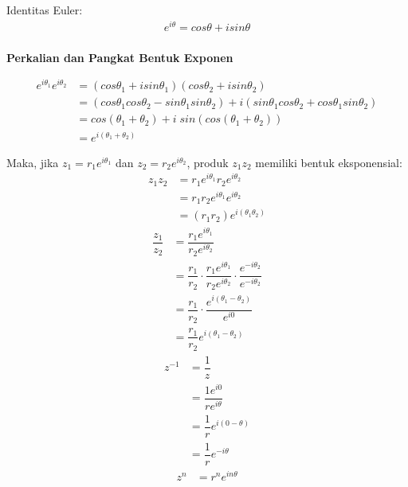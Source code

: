 \documentclass{article}
\begin{document}
    Identitas Euler:
    \begin{align}
        e^{i\theta} = cos\theta + i sin\theta \\\nonumber
    \end{align}

    \newpage
    \begin{center}
        \textbf{Perkalian dan Pangkat Bentuk Exponen}
    \end{center}
    \begin{align}
        e^{i\theta_1} e^{i\theta_2} &= (cos\theta_1 + i sin\theta_1)(cos\theta_2 + i sin\theta_2)
                                    \nonumber\\
                                    &=(cos\theta_1 cos\theta_2 - sin\theta_1 sin\theta_2) + i(sin\theta_1cos\theta_2 + cos\theta_1 sin\theta_2)
                                    \nonumber\\
                                    &= cos(\theta_1 + \theta_2) + i\;sin(cos(\theta_1 + \theta_2))
                                    \nonumber\\
                                    &= e^{i(\theta_1 + \theta_2)}
    \end{align}
    
    Maka, jika $z_1 = r_1e^{i\theta_1}$ dan $z_2 = r_2e^{i\theta_2}$, produk $z_1z_2$ memiliki bentuk eksponensial:
    \begin{align}
        z_1z_2  &= r_1e^{i\theta_1} r_2e^{i\theta_2}
                \nonumber\\
                &= r_1r_2e^{i\theta_1}e^{i\theta_2}
                \nonumber\\
                &= (r_1r_2)e^{i(\theta_1\theta_2)}
    \end{align}
    \begin{align}
        \dfrac{z_1}{z_2}    &= \dfrac{r_1e^{i\theta_1}}{r_2e^{i\theta_2}}
                            \nonumber\\
                            &= \dfrac{r_1}{r_2} \cdot \dfrac{r_1e^{i\theta_1}}{r_2e^{i\theta_2}} \cdot \dfrac{e^{-i\theta_2}}{e^{-i\theta_2}}
                            \nonumber\\
                            &= \dfrac{r_1}{r_2} \cdot \dfrac{e^{i(\theta_1-\theta_2)}}{e^{i0}}
                            \nonumber\\
                            &= \dfrac{r_1}{r_2} e^{i(\theta_1-\theta_2)}
    \end{align}
    \begin{align}
        z^{-1}  &= \dfrac{1}{z}
                \nonumber\\
                &= \dfrac{1e^{i0}}{re^{i\theta}}
                \nonumber\\
                &= \dfrac{1}{r} e^{i(0-\theta)}
                \nonumber\\
                &= \dfrac{1}{r} e^{-i\theta}
    \end{align}
    \begin{align}
        z^n &= r^n e^{in\theta}
    \end{align}
\end{document}
